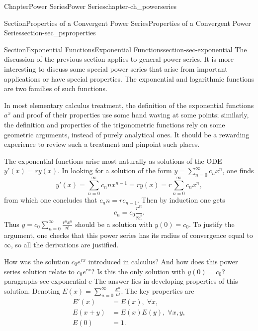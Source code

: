 \documentclass[oneside,10pt,]{book}
\numberwithin{equation}{section}
\newcommand{\amp}{&}
\begin{document}
\begin{chapterptx}{Chapter}{Power Series}{}{Power Series}{}{}{chapter-ch_powerseries}
\begin{sectionptx}{Section}{Properties of a Convergent Power Series}{}{Properties of a Convergent Power Series}{}{}{section-sec_psproperties}
\end{sectionptx}
%
%
\typeout{************************************************}
\typeout{************************************************}
%
\begin{sectionptx}{Section}{Exponential Functions}{}{Exponential Functions}{}{}{section-sec-exponential}
The discussion of the previous section applies to general power series. It is more interesting to discuss some special power series that arise from important applications or have special properties. The exponential and logarithmic functions are two families of such functions.%
\par
In most elementary calculus treatment, the definition of the exponential functions \(a^{x}\) and proof of their properties use some hand waving at some points; similarly,  the definition and properties of the trigonometric functions rely on some geometric arguments, instead of purely analytical ones. It should be a rewarding experience to review such a treatment and pinpoint such places.%
\par
The exponential functions arise most naturally as solutions of the ODE \(y'(x)=ry(x)\). In looking for a solution of the form \(y=\sum_{n=0}^{\infty}c_{n}  x^{n}\), one finds%
\begin{equation*}
y'(x)=\sum_{n=0}^{\infty}c_{n} n x^{n-1} =ry(x)= r \sum_{n=0}^{\infty}c_{n}  x^{n},
\end{equation*}
from which one concludes that \(c_{n} n =rc_{n-1}\). Then by induction one gets%
\begin{equation*}
c_{n}=c_{0}\frac{r^{n}}{n!}.
\end{equation*}
Thus \(y=c_{0}\sum_{n=0}^{\infty}\frac{r^{n}x^{n}}{n!}\) should be a solution with \(y(0)=c_{0}\). To justify the argument, one checks that this power series has its radius of convergence equal to \(\infty\), so all the derivations are justified.%
\begin{paragraphs}{How was the solution \(c_{0}e^{rx}\) introduced in calculus? And how does this power series solution relate to \(c_{0}e^{rx}\)? Is this the only solution with \(y(0)=c_{0}\)?}{paragraphs-sec-exponential-e}%
The answer lies in developing properties of this solution. Denoting \(E(x)=\sum_{n=0}^{\infty}\frac{x^{n}}{n!}\). The key properties are%
\begin{align*}
E'(x) \amp = E(x), \; \forall x,\\
E(x+y) \amp=E(x) E(y),\;  \forall x, y,\\
E(0)\amp=1.

\end{align*}
\end{paragraphs}
\end{sectionptx}
\end{chapterptx}
\end{document}
